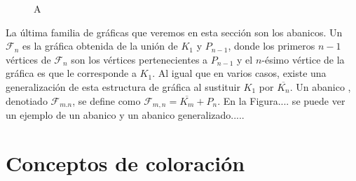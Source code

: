 \begin{figure}[ht!]
    \centering
    \caption{A}
    \label{fig:ex-hamilt}
\end{figure}

La \'ultima familia de gr\'aficas que veremos en esta secci\'on son los
abanicos. Un  $\mathcal{F}_n$ es la gr\'afica obtenida de la
uni\'on de $K_1$ y $P_{n-1}$, donde los primeros $n-1$ v\'ertices de
$\mathcal{F}_n$ son los v\'ertices pertenecientes a $P_{n-1}$ y el $n$-\'esimo
v\'ertice de la gr\'afica es que le corresponde a $K_1$. Al igual que en varios
casos, existe una generalizaci\'on de esta estructura de gr\'afica al sustituir
$K_1$ por $\overline{K_n}$. Un abanico ,
denotiado $\mathcal{F}_{m.n}$, se define como
$\mathcal{F}_{m,n}=\overline{K_m}+P_n$. En la Figura.... se puede ver un ejemplo
de un abanico y un abanico generalizado.....



\section{Conceptos de coloraci\'on}
\label{sec:coloracion}

